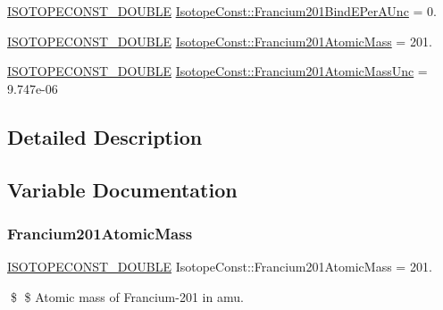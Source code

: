 \begin{DoxyCompactItemize}
\mbox{\hyperlink{group___isotope_const-_macros_ga8f45a7272ce02c0b4c65c44636ed719a}{I\+S\+O\+T\+O\+P\+E\+C\+O\+N\+S\+T\+\_\+\+D\+O\+U\+B\+LE}} \mbox{\hyperlink{group___isotope_const-_francium-_fr201_ga6731eca96d446269ec4f21818670abe0}{Isotope\+Const\+::\+Francium201\+Bind\+E\+Per\+A\+Unc}} = 0.
\item 
\mbox{\hyperlink{group___isotope_const-_macros_ga8f45a7272ce02c0b4c65c44636ed719a}{I\+S\+O\+T\+O\+P\+E\+C\+O\+N\+S\+T\+\_\+\+D\+O\+U\+B\+LE}} \mbox{\hyperlink{group___isotope_const-_francium-_fr201_ga0f9decc759d0b8b8fabd471c028d23f6}{Isotope\+Const\+::\+Francium201\+Atomic\+Mass}} = 201.
\item 
\mbox{\hyperlink{group___isotope_const-_macros_ga8f45a7272ce02c0b4c65c44636ed719a}{I\+S\+O\+T\+O\+P\+E\+C\+O\+N\+S\+T\+\_\+\+D\+O\+U\+B\+LE}} \mbox{\hyperlink{group___isotope_const-_francium-_fr201_gafc8a125034ba6892ce90b7bb5ef68658}{Isotope\+Const\+::\+Francium201\+Atomic\+Mass\+Unc}} = 9.\+747e-\/06
\end{DoxyCompactItemize}


\subsection{Detailed Description}


\subsection{Variable Documentation}
\mbox{\label{group___isotope_const-_francium-_fr201_ga0f9decc759d0b8b8fabd471c028d23f6}} 
\subsubsection{\texorpdfstring{Francium201\+Atomic\+Mass}{Francium201AtomicMass}}
{\footnotesize\ttfamily \mbox{\hyperlink{group___isotope_const-_macros_ga8f45a7272ce02c0b4c65c44636ed719a}{I\+S\+O\+T\+O\+P\+E\+C\+O\+N\+S\+T\+\_\+\+D\+O\+U\+B\+LE}} Isotope\+Const\+::\+Francium201\+Atomic\+Mass = 201.}

\$ \$ Atomic mass of Francium-\/201 in amu. \mbox{\label{group___isotope_const-_francium-_fr201_gafc8a125034ba6892ce90b7bb5ef68658}} 
